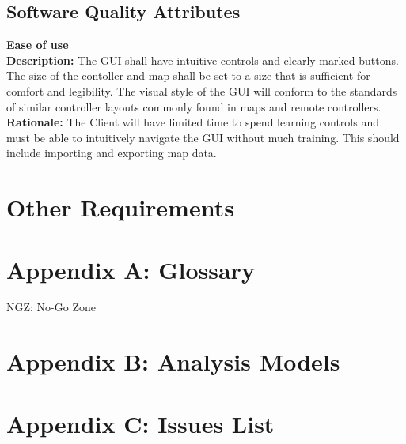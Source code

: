 \documentclass[10pt,a4paper,titlepage]{article}
\begin{document}
	\subsection{Software Quality Attributes}
		
		\textbf {Ease of use}\\
		\textbf {Description:} The GUI shall have intuitive controls and clearly marked buttons. The size of the contoller and map shall be set to a size that is sufficient for comfort and legibility. The visual style of the GUI will conform to the standards of similar controller layouts commonly found in maps and remote controllers.\\
		\textbf {Rationale:} The Client will have limited time to spend learning controls and must be able to intuitively navigate the GUI without much training. This should include importing and exporting map data.\\

	\section{Other Requirements}

	\section{Appendix A: Glossary}
		NGZ: No-Go Zone

	\section{Appendix B: Analysis Models}

	\section{Appendix C: Issues List}
\end{document}
